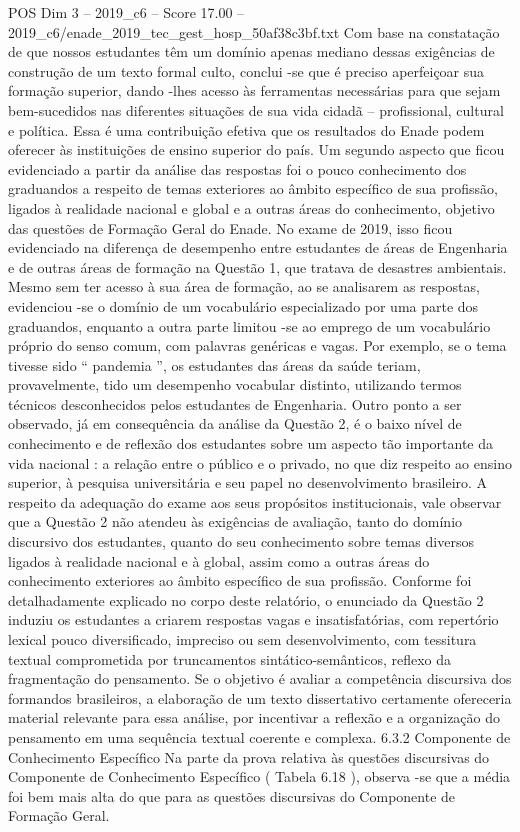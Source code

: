 \begin{textsample}{POS Dim 3 – 2019\_c6 – Score 17.00 – 2019\_c6/enade\_2019\_tec\_gest\_hosp\_50af38c3bf.txt}
Com base na constatação de que nossos estudantes têm um domínio apenas mediano dessas exigências de construção de um texto formal culto, conclui -se que é preciso aperfeiçoar sua formação superior, dando -lhes acesso às ferramentas necessárias para que sejam bem-sucedidos nas diferentes situações de sua vida cidadã – profissional, cultural e política.
Essa é uma contribuição efetiva que os resultados do Enade podem oferecer às instituições de ensino superior do país.
Um segundo aspecto que ficou evidenciado a partir da análise das respostas foi o pouco conhecimento dos graduandos a respeito de temas exteriores ao âmbito específico de sua profissão, ligados à realidade nacional e global e a outras áreas do conhecimento, objetivo das questões de Formação Geral do Enade.
No exame de 2019, isso ficou evidenciado na diferença de desempenho entre estudantes de áreas de Engenharia e de outras áreas de formação na Questão 1, que tratava de desastres ambientais.
Mesmo sem ter acesso à sua área de formação, ao se analisarem as respostas, evidenciou -se o domínio de um vocabulário especializado por uma parte dos graduandos, enquanto a outra parte limitou -se ao emprego de um vocabulário próprio do senso comum, com palavras genéricas e vagas.
Por exemplo, se o tema tivesse sido “ pandemia ”, os estudantes das áreas da saúde teriam, provavelmente, tido um desempenho vocabular distinto, utilizando termos técnicos desconhecidos pelos estudantes de Engenharia.
Outro ponto a ser observado, já em consequência da análise da Questão 2, é o baixo nível de conhecimento e de reflexão dos estudantes sobre um aspecto tão importante da vida nacional : a relação entre o público e o privado, no que diz respeito ao ensino superior, à pesquisa universitária e seu papel no desenvolvimento brasileiro.
A respeito da adequação do exame aos seus propósitos institucionais, vale observar que a Questão 2 não atendeu às exigências de avaliação, tanto do domínio discursivo dos estudantes, quanto do seu conhecimento sobre temas diversos ligados à realidade nacional e à global, assim como a outras áreas do conhecimento exteriores ao âmbito específico de sua profissão.
Conforme foi detalhadamente explicado no corpo deste relatório, o enunciado da Questão 2 induziu os estudantes a criarem respostas vagas e insatisfatórias, com repertório lexical pouco diversificado, impreciso ou sem desenvolvimento, com tessitura textual comprometida por truncamentos sintático-semânticos, reflexo da fragmentação do pensamento.
Se o objetivo é avaliar a competência discursiva dos formandos brasileiros, a elaboração de um texto dissertativo certamente ofereceria material relevante para essa análise, por incentivar a reflexão e a organização do pensamento em uma sequência textual coerente e complexa. 6.3.2 Componente de Conhecimento Específico Na parte da prova relativa às questões discursivas do Componente de Conhecimento Específico ( Tabela 6.18 ), observa -se que a média foi bem mais alta do que para as questões discursivas do Componente de Formação Geral.

\end{textsample}
